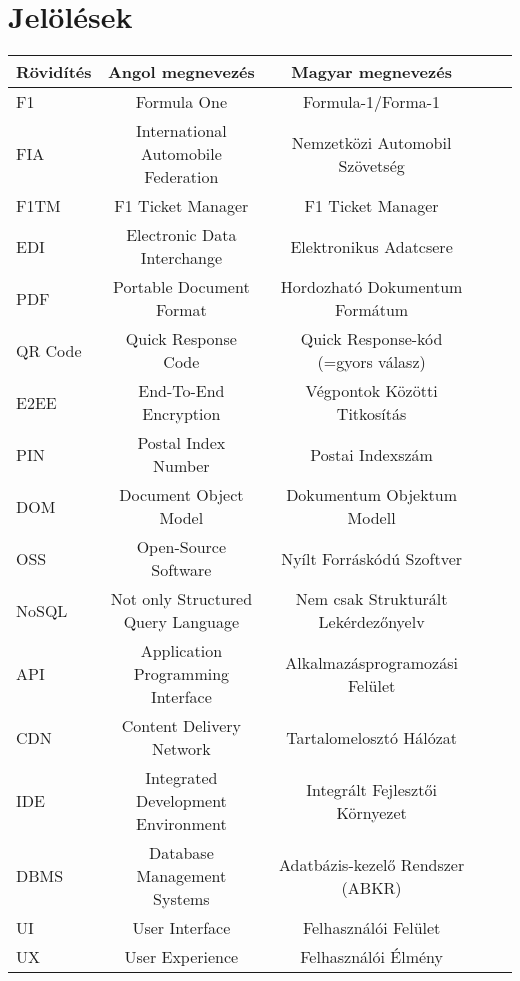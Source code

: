 \chapter*{Jelölések}

\begin{table}[h!]
	\centering
	\begin{tabular}{ | l | c | c | c | c |}
		\hline 
		\textbf{Rövidítés} & \textbf{Angol megnevezés} & \textbf{Magyar megnevezés}\\
		\hline
		F1 & Formula One & Formula-1/Forma-1\\
		\hline
		FIA & International Automobile Federation & Nemzetközi Automobil Szövetség \\
		\hline
		F1TM & F1 Ticket Manager & F1 Ticket Manager \\
		\hline
		EDI & Electronic Data Interchange & Elektronikus Adatcsere \\
		\hline
		PDF & Portable Document Format & Hordozható Dokumentum Formátum \\
		\hline
		QR Code & Quick Response Code & Quick Response-kód (=gyors válasz) \\
		\hline
		E2EE & End-To-End Encryption & Végpontok Közötti Titkosítás \\
		\hline
		PIN & Postal Index Number & Postai Indexszám \\
		\hline
		DOM & Document Object Model & Dokumentum Objektum Modell \\
		\hline
		OSS & Open-Source Software & Nyílt Forráskódú Szoftver \\
		\hline
		NoSQL & Not only Structured Query Language & Nem csak Strukturált
		 Lekérdezőnyelv \\
		\hline
		API & Application Programming Interface & Alkalmazásprogramozási Felület \\
		\hline
		CDN & Content Delivery Network & Tartalomelosztó Hálózat \\
		\hline
		IDE & Integrated Development Environment & Integrált Fejlesztői Környezet \\
		\hline
		DBMS & Database Management Systems & Adatbázis-kezelő Rendszer (ABKR) \\
		\hline
		UI & User Interface & Felhasználói Felület \\
		\hline
		UX & User Experience & Felhasználói Élmény \\

\end{tabular}
\end{table}
